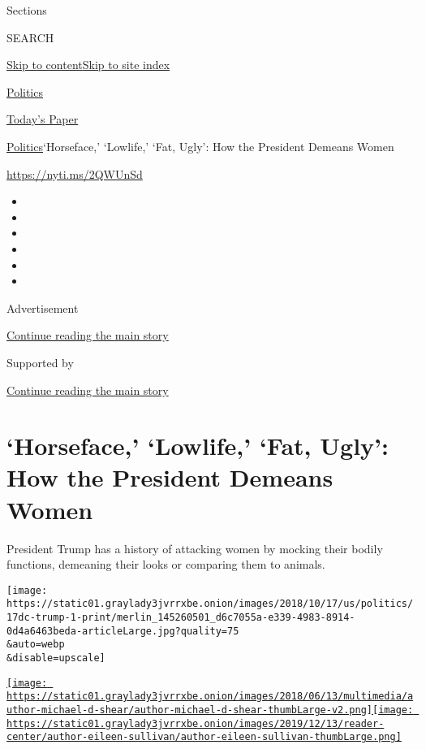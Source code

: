 Sections

SEARCH

\protect\hyperlink{site-content}{Skip to
content}\protect\hyperlink{site-index}{Skip to site index}

\href{https://www.nytimes3xbfgragh.onion/section/politics}{Politics}

\href{https://myaccount.nytimes3xbfgragh.onion/auth/login?response_type=cookie\&client_id=vi}{}

\href{https://www.nytimes3xbfgragh.onion/section/todayspaper}{Today's
Paper}

\href{/section/politics}{Politics}\textbar{}`Horseface,' `Lowlife,'
`Fat, Ugly': How the President Demeans Women

\url{https://nyti.ms/2QWUnSd}

\begin{itemize}
\item
\item
\item
\item
\item
\item
\end{itemize}

Advertisement

\protect\hyperlink{after-top}{Continue reading the main story}

Supported by

\protect\hyperlink{after-sponsor}{Continue reading the main story}

\hypertarget{horseface-lowlife-fat-ugly-how-the-president-demeans-women}{%
\section{`Horseface,' `Lowlife,' `Fat, Ugly': How the President Demeans
Women}\label{horseface-lowlife-fat-ugly-how-the-president-demeans-women}}

President Trump has a history of attacking women by mocking their bodily
functions, demeaning their looks or comparing them to animals.

\texttt{[image: https://static01.graylady3jvrrxbe.onion/images/2018/10/17/us/politics/17dc-trump-1-print/merlin\_145260501\_d6c7055a-e339-4983-8914-0d4a6463beda-articleLarge.jpg?quality=75\\\&auto=webp\\\&disable=upscale]}

\href{https://www.nytimes3xbfgragh.onion/by/michael-d-shear}{\texttt{[image: https://static01.graylady3jvrrxbe.onion/images/2018/06/13/multimedia/author-michael-d-shear/author-michael-d-shear-thumbLarge-v2.png]}}\href{https://www.nytimes3xbfgragh.onion/by/eileen-sullivan}{\texttt{[image: https://static01.graylady3jvrrxbe.onion/images/2019/12/13/reader-center/author-eileen-sullivan/author-eileen-sullivan-thumbLarge.png]}}

